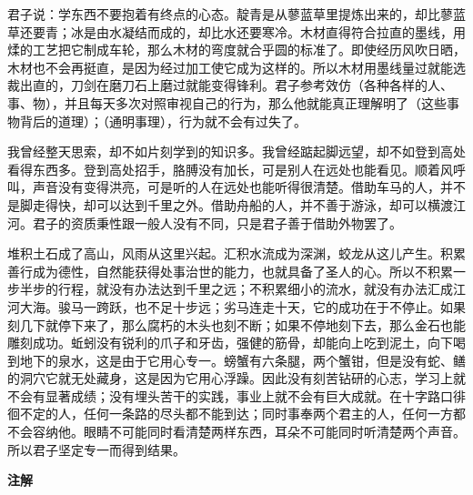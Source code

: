 \documentclass[12pt,UTF-8,openany,a4]{ctexbook}
\begin{document}
\begin{large}
    \yiwen 
    君子说：学东西不要抱着有终点的心态。靛青是从蓼蓝草里提炼出来的，却比蓼蓝草还要青；冰是由水凝结而成的，却比水还要寒冷。木材直得符合拉直的墨线，用煣的工艺把它制成车轮，那么木材的弯度就合乎圆的标准了。即使经历风吹日晒，木材也不会再挺直，是因为经过加工使它成为这样的。所以木材用墨线量过就能选裁出直的，刀剑在磨刀石上磨过就能变得锋利。君子参考效仿（各种各样的人、事、物），并且每天多次对照审视自己的行为，那么他就能真正理解明了（这些事物背后的道理）；（通明事理），行为就不会有过失了。
    
    我曾经整天思索，却不如片刻学到的知识多。我曾经踮起脚远望，却不如登到高处看得东西多。登到高处招手，胳膊没有加长，可是别人在远处也能看见。顺着风呼叫，声音没有变得洪亮，可是听的人在远处也能听得很清楚。借助车马的人，并不是脚走得快，却可以达到千里之外。借助舟船的人，并不善于游泳，却可以横渡江河。君子的资质秉性跟一般人没有不同，只是君子善于借助外物罢了。
    
    堆积土石成了高山，风雨从这里兴起。汇积水流成为深渊，蛟龙从这儿产生。积累善行成为德性，自然能获得处事治世的能力，也就具备了圣人的心。所以不积累一步半步的行程，就没有办法达到千里之远；不积累细小的流水，就没有办法汇成江河大海。骏马一跨跃，也不足十步远；劣马连走十天，它的成功在于不停止。如果刻几下就停下来了，那么腐朽的木头也刻不断；如果不停地刻下去，那么金石也能雕刻成功。蚯蚓没有锐利的爪子和牙齿，强健的筋骨，却能向上吃到泥土，向下喝到地下的泉水，这是由于它用心专一。螃蟹有六条腿，两个蟹钳，但是没有蛇、鳝的洞穴它就无处藏身，这是因为它用心浮躁。因此没有刻苦钻研的心志，学习上就不会有显著成绩；没有埋头苦干的实践，事业上就不会有巨大成就。在十字路口徘徊不定的人，任何一条路的尽头都不能到达；同时事奉两个君主的人，任何一方都不会容纳他。眼睛不可能同时看清楚两样东西，耳朵不可能同时听清楚两个声音。所以君子坚定专一而得到结果。
    
\end{large}


\newpage

\begin{Large}
    \noindent\textbf{注解}
\end{Large}


\vspace{-1em}
\end{document}
